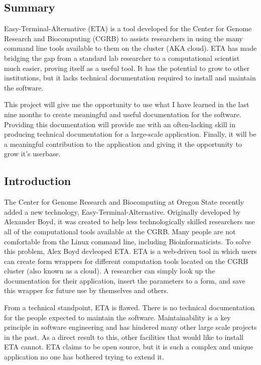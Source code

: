 \documentclass[a4paper,12pt]{texMemo}
\begin{document}
\maketitle
\noindent 

\subsection*{Summary}
Easy-Terminal-Alternative (ETA) is a tool developed for the Center for Genome Research and Biocomputing (CGRB) to assists researchers in using the many command line tools available to them on the cluster (AKA cloud). ETA has made bridging the gap from a standard lab researcher to a computational scientist much easier, proving itself as a useful tool. It has the potential to grow to other institutions, but it lacks technical documentation required to install and maintain the software.

This project will give me the opportunity to use what I have learned in the last nine months to create meaningful and useful documentation for the software. Providing this documentation will provide me with an often-lacking skill in producing technical documentation for a large-scale application. Finally, it will be a meaningful contribution to the application and giving it the opportunity to grow it's userbase. 
\subsection*{Introduction}

The Center for Genome Research and Biocomputing at Oregon State recently added a new technology, Easy-Terminal-Alternative. Originally developed by Alexander Boyd, it was created to help less technologically skilled researchers use all of the computational tools available at the CGRB. Many people are not comfortable from the Linux command line, including Bioinformaticists. To solve this problem, Alex Boyd devleoped ETA. ETA is a web-driven tool in which users can create form wrappers for different computation tools located on the CGRB cluster (also known as a cloud). A researcher can simply look up the documentation for their application, insert the parameters to a form, and save this wrapper for future use by themselves and others. 

From a technical standpoint, ETA is flawed. There is no technical documentation for the people expected to maintain the software. Maintainability is a key principle in software engineering and has hindered many other large scale projects in the past. As a direct result to this, other facilities that would like to install ETA cannot. ETA claims to be open source, but it is such a complex and unique application no one has bothered trying to extend it.
\end{document}
